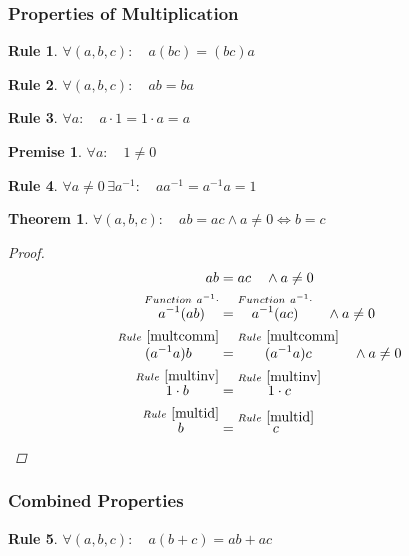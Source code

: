 \documentclass{article}
\numberwithin{equation}{subsubsection}
\newtheorem{lrule}{Rule}
\newtheorem{prem}{Premise}
\newtheorem{thm}{Theorem}
\newcommand{\from}[3]{\overset{#1~#2}{#3}}
\begin{document}
	\subsubsection{Properties of Multiplication}
	    \begin{lrule}\label{multassoc} $ \forall (a,b,c) : \quad a(bc) = (bc)a $ \end{lrule} 
	    \begin{lrule}\label{multcomm} $ \forall (a,b,c) : \quad ab = ba $ \end{lrule}
	    \begin{lrule}\label{multid} $ \forall a : \quad a \cdot 1 = 1 \cdot a = a $ \end{lrule}
	    \begin{prem} $ \forall a : \quad 1 \neq 0 $ \end{prem}
	    \begin{lrule}\label{multinv} $ \forall a \neq 0 \,\exists a^{-1} : \quad aa^{-1} = a^{-1}a = 1 $ \end{lrule}

	    \begin{thm}
		$ \forall (a,b,c) : \quad ab = ac \wedge a \neq 0 \iff b = c $
		\begin{proof}
		    \begin{align}
			ab &= ac \quad \wedge a \neq 0 \\
			\from{Function}{a^{-1} \cdot}{a^{-1}(ab)} &= \from{Function}{a^{-1} \cdot}{a^{-1}(ac)} \quad \wedge a \neq 0 \\
			\from{Rule}{\ref{multcomm}}{(a^{-1}a)b} &= \from{Rule}{\ref{multcomm}}{(a^{-1}a)c} \quad \wedge a \neq 0 \\
			\from{Rule}{\ref{multinv}}{1 \cdot b} &= \from{Rule}{\ref{multinv}}{1 \cdot c} \\
			\from{Rule}{\ref{multid}}{b} &= \from{Rule}{\ref{multid}}{c}
		    \end{align}
		\end{proof}
	    \end{thm}

	\subsubsection{Combined Properties}
	    \begin{lrule}\label{distrib} $ \forall (a,b,c) : \quad a(b + c) = ab + ac $ \end{lrule}
\end{document}
